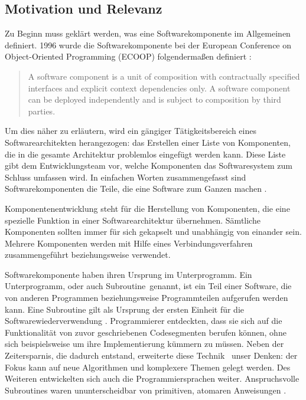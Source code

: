 \subsection{Motivation und Relevanz}
\label{sec:1_Relevanz}

Zu Beginn muss geklärt werden, was eine Softwarekomponente im Allgemeinen definiert. 1996 wurde die Softwarekomponente bei der European Conference on Object-Oriented Programming (ECOOP) folgendermaßen definiert \autocite{Szyperski.2002}:
\begin{quote}
\glqq A software component is a unit of composition with contractually specified interfaces and explicit context dependencies only. A software component can be deployed independently and is subject to composition by third parties.\grqq
\end{quote}
Um dies näher zu erläutern, wird ein gängiger Tätigkeitsbereich eines Softwarearchitekten herangezogen: das Erstellen einer Liste von Komponenten, die in die gesamte Architektur problemlos eingefügt werden kann. Diese Liste gibt dem Entwicklungsteam vor, welche Komponenten das Softwaresystem zum Schluss umfassen wird. In einfachen Worten zusammengefasst sind Softwarekomponenten die Teile, die eine Software zum Ganzen machen \citereset \autocite{Szyperski.2002}.

Komponentenentwicklung steht für die Herstellung von Komponenten, die eine spezielle Funktion in einer Softwarearchitektur übernehmen. Sämtliche Komponenten sollten immer für sich gekapselt und unabhängig von einander sein. Mehrere Komponenten werden mit Hilfe eines Verbindungsverfahren zusammengeführt beziehungsweise verwendet.

Softwarekomponente haben ihren Ursprung im \glqq Unterprogramm\grqq . Ein \glqq Unterprogramm\grqq , oder auch \glqq Subroutine\grqq\ genannt, ist ein Teil einer Software, die von anderen Programmen beziehungsweise Programmteilen aufgerufen werden kann. Eine Subroutine gilt als Ursprung der ersten Einheit für die Softwarewiederverwendung \autocite{Wheeler.1985}. Programmierer entdeckten, dass sie sich auf die Funktionalität von zuvor geschriebenen Codesegmenten berufen können, ohne sich beispielsweise um ihre Implementierung kümmern zu müssen. Neben der Zeitersparnis, die dadurch entstand, erweiterte diese \glqq Technik \grqq\ unser Denken:
der Fokus kann auf neue Algorithmen und komplexere Themen gelegt werden. Des Weiteren entwickelten sich auch die Programmiersprachen weiter. Anspruchsvolle Subroutines waren ununterscheidbar von primitiven, atomaren Anweisungen \autocite{Szyperski.2002}.

